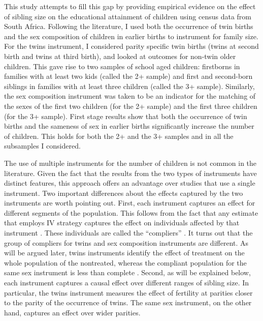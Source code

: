 This study attempts to fill this gap by providing empirical evidence on the effect of sibling size on the educational attainment of children using census data from South Africa. Following the literature, I used both the occurrence of twin births and the sex composition of children in earlier births to instrument for family size. For the twins instrument, I considered parity specific twin births (twins at second birth and twins at third birth), and looked at outcomes for non-twin older children. This gave rise to two samples of school aged children: firstborns in families with at least two kids (called the 2+ sample) and first and second-born siblings in families with at least three children (called the 3+ sample). Similarly, the sex composition instrument was taken to be an indicator for the matching of the sexes of the first two children (for the 2+ sample) and the first three children (for the 3+ sample). First stage results show that both the occurrence of twin births and the sameness of sex in earlier births significantly increase the number of children. This holds for both the 2+ and the 3+ samples and in all the subsamples I considered.

The use of multiple instruments for the number of children is not common in the literature. Given the fact that the results from the two types of instruments have distinct features, this approach offers an advantage over studies that use a single instrument. Two important differences about the effects captured by the two instruments are worth pointing out. First, each instrument captures an effect for different segments of the population. This follows from the fact that any estimate that employs IV strategy captures the effect on individuals affected by that instrument \parencite{imbens_identification_1994}. These individuals are called the \enquote{compliers} \parencite{angrist_identification_1996}. It turns out that the group of compliers for twins and sex composition instruments are different. As will be argued later, twins instruments identify the effect of treatment on the whole population of the nontreated, whereas the compliant population for the same sex instrument is less than complete \parencite{Angrist2006,Angrist2009}. Second, as will be explained below, each instrument captures a causal effect over different ranges of sibling size. In particular, the twins instrument measures the effect of fertility at parities closer to the parity of the occurrence of twins. The same sex instrument, on the other hand, captures an effect over wider parities. 

